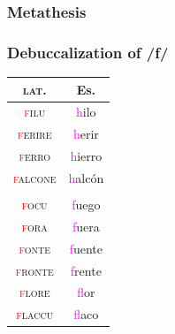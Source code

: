 \documentclass{report}[12pt]
\begin{document}
\subsubsection*{Metathesis}

\begin{tcolorbox}

\end{tcolorbox}

\subsubsection*{Debuccalization of /f/}

\begin{tcolorbox}
  
\end{tcolorbox}

\begin{tabular}{c c}
  \textsc{lat.} & Es. \\
  \hline
  \textsc{\textcolor{red}{f}ilu} & \textcolor{magenta}{h}ilo \\
  \textsc{\textcolor{red}{f}erire} & \textcolor{magenta}{h}erir \\
  \textsc{\textcolor{red}{f}erro} & \textcolor{magenta}{h}ierro \\
  \textsc{\textcolor{red}{f}alcone} & \textcolor{magenta}{h}alcón \\
                & \\
  \textsc{\textcolor{red}{f}ocu} & \textcolor{magenta}{f}uego \\
  \textsc{\textcolor{red}{f}ora} & \textcolor{magenta}{f}uera \\
  \textsc{\textcolor{red}{f}onte} & \textcolor{magenta}{f}uente \\
  \textsc{\textcolor{red}{f}ronte} & \textcolor{magenta}{f}rente \\
  \textsc{\textcolor{red}{f}lore} & \textcolor{magenta}{f}lor \\
  \textsc{\textcolor{red}{f}laccu} & \textcolor{magenta}{f}laco \\
\end{tabular}

\pagebreak
\end{document}
